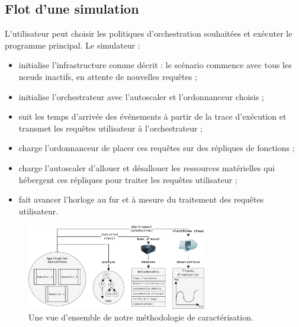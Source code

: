 \subsection{Flot d'une simulation}

L'utilisateur peut choisir les politiques d'orchestration souhaitées et exécuter le programme principal. Le simulateur :

\begin{itemize}
    \item initialise l'infrastructure comme décrit : le scénario commence avec tous les nœuds inactifs, en attente de nouvelles requêtes ;
    \item initialise l'orchestrateur avec l'autoscaler et l'ordonnanceur choisis ;
    \item suit les temps d'arrivée des événements à partir de la trace d'exécution et transmet les requêtes utilisateur à l'orchestrateur ;
    \item charge l'ordonnanceur de placer ces requêtes sur des répliques de fonctions ;
    \item charge l'autoscaler d'allouer et désallouer les ressources matérielles qui hébergent ces répliques pour traiter les requêtes utilisateur ;
    \item fait avancer l'horloge au fur et à mesure du traitement des requêtes utilisateur.
\end{itemize}


\begin{figure}[!ht]
    \centering
    \includegraphics[width=0.7\textwidth]{6_Chapitre6/figures/characterization.png}
    \caption{Une vue d'ensemble de notre méthodologie de caractérisation.}
\label{figure:herosim-characterization}
\end{figure}

